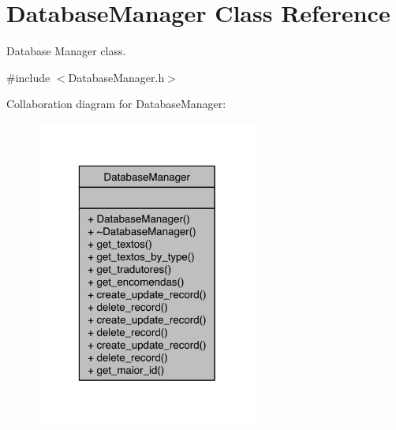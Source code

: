 \hypertarget{class_database_manager}{\section{Database\-Manager Class Reference}
\label{class_database_manager}
}


Database Manager class.  




{\ttfamily \#include $<$Database\-Manager.\-h$>$}



Collaboration diagram for Database\-Manager\-:
\nopagebreak
\begin{figure}[H]
\begin{center}
\leavevmode
\includegraphics[width=208pt]{class_database_manager__coll__graph}
\end{center}
\end{figure}
